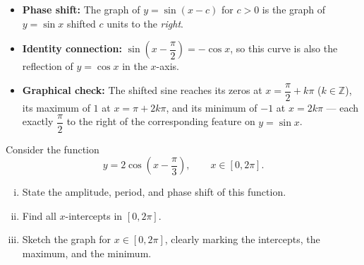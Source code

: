 \begin{takeaways}
\begin{itemize}[leftmargin=*]
  \item \textbf{Phase shift:} The graph of $y = \sin(x - c)$ for $c > 0$ is the
        graph of $y = \sin x$ shifted $c$ units to the \emph{right}.

  \item \textbf{Identity connection:}
        $\sin\!\left(x - \dfrac{\pi}{2}\right) = -\cos x$,
        so this curve is also the reflection of $y = \cos x$ in the $x$-axis.

  \item \textbf{Graphical check:} The shifted sine reaches its zeros at
        $x = \dfrac{\pi}{2} + k\pi$ ($k \in \mathbb{Z}$), its maximum of $1$
        at $x = \pi + 2k\pi$, and its minimum of $-1$ at $x = 2k\pi$
        — each exactly $\dfrac{\pi}{2}$ to the right of the corresponding
        feature on $y = \sin x$.
\end{itemize}
\end{takeaways}

\begin{problem}
Consider the function
\[
y = 2\cos\!\left(x - \frac{\pi}{3}\right), \qquad x \in [0, 2\pi].
\]
\begin{enumerate}[(i)]
  \item State the amplitude, period, and phase shift of this function.
  \item Find all $x$-intercepts in $[0, 2\pi]$.
  \item Sketch the graph for $x \in [0, 2\pi]$, clearly marking the intercepts,
        the maximum, and the minimum.
\end{enumerate}
\end{problem}

